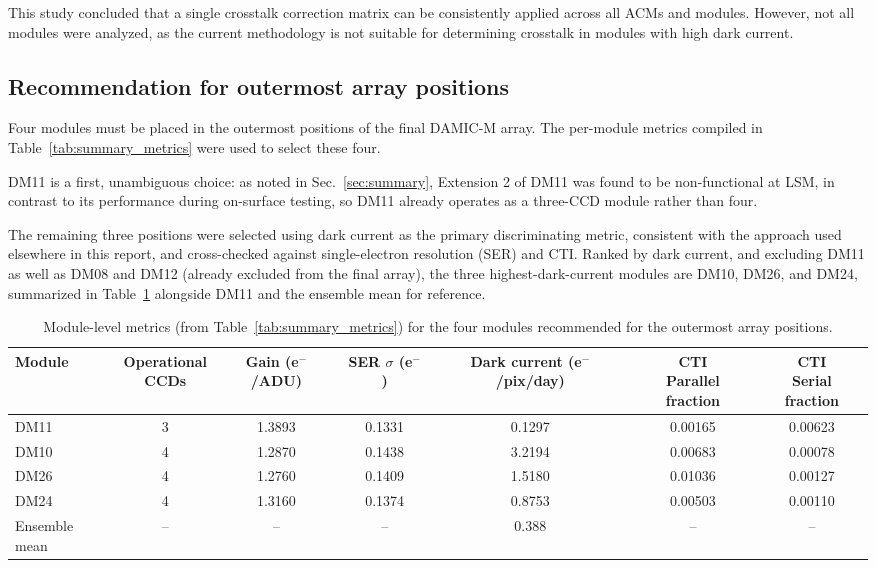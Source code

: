 \documentclass[11pt]{article}
\begin{document}
This study concluded that a single crosstalk correction matrix can be consistently applied across all ACMs and modules. However, not all modules were analyzed, as the current methodology is not suitable for determining crosstalk in modules with high dark current.

\FloatBarrier

\subsection{Recommendation for outermost array positions}
\label{sec:outermost_modules}

Four modules must be placed in the outermost positions of the final DAMIC-M array. The per-module metrics compiled in Table~\ref{tab:summary_metrics} were used to select these four.

DM11 is a first, unambiguous choice: as noted in Sec.~\ref{sec:summary}, Extension 2 of DM11 was found to be non-functional at LSM, in contrast to its performance during on-surface testing, so DM11 already operates as a three-CCD module rather than four.

The remaining three positions were selected using dark current as the primary discriminating metric, consistent with the approach used elsewhere in this report, and cross-checked against single-electron resolution (SER) and CTI. Ranked by dark current, and excluding DM11 as well as DM08 and DM12 (already excluded from the final array), the three highest-dark-current modules are DM10, DM26, and DM24, summarized in Table~\ref{tab:outermost_candidates} alongside DM11 and the ensemble mean for reference.

\begin{table}[H]
\centering
\caption{Module-level metrics (from Table~\ref{tab:summary_metrics}) for the four modules recommended for the outermost array positions.}
\label{tab:outermost_candidates}
\renewcommand{\arraystretch}{1.2}
\begin{tabular}{@{}lcccccc@{}}
\toprule
Module
& \makecell{Operational \\ CCDs}
& \makecell{Gain \\ (e$^{-}$/ADU)}
& \makecell{SER $\sigma$ \\ (e$^{-}$)}
& \makecell{Dark current \\ (e$^{-}$/pix/day)}
& \makecell{CTI \\ Parallel fraction}
& \makecell{CTI \\ Serial fraction} \\
\midrule
DM11 & 3 & 1.3893 & 0.1331 & 0.1297 & 0.00165 & 0.00623 \\
DM10 & 4 & 1.2870 & 0.1438 & 3.2194 & 0.00683 & 0.00078 \\
DM26 & 4 & 1.2760 & 0.1409 & 1.5180 & 0.01036 & 0.00127 \\
DM24 & 4 & 1.3160 & 0.1374 & 0.8753 & 0.00503 & 0.00110 \\
\midrule
Ensemble mean & -- & -- & -- & 0.388 & -- & -- \\
\bottomrule
\end{tabular}
\end{table}
\end{document}
